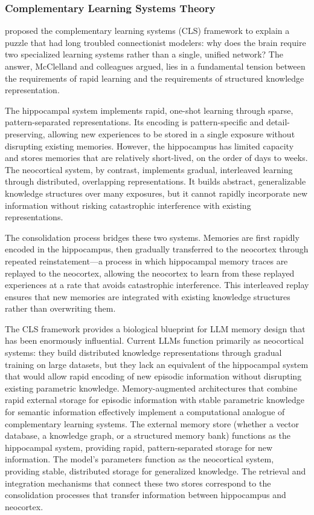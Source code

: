 \documentclass[11pt,letterpaper]{article}
\begin{document}
\subsubsection{Complementary Learning Systems Theory}

\cite{mcclelland1995complementary} proposed the complementary learning systems (CLS) framework to explain a puzzle that had long troubled connectionist modelers: why does the brain require two specialized learning systems rather than a single, unified network? The answer, McClelland and colleagues argued, lies in a fundamental tension between the requirements of rapid learning and the requirements of structured knowledge representation.

The hippocampal system implements rapid, one-shot learning through sparse, pattern-separated representations. Its encoding is pattern-specific and detail-preserving, allowing new experiences to be stored in a single exposure without disrupting existing memories. However, the hippocampus has limited capacity and stores memories that are relatively short-lived, on the order of days to weeks. The neocortical system, by contrast, implements gradual, interleaved learning through distributed, overlapping representations. It builds abstract, generalizable knowledge structures over many exposures, but it cannot rapidly incorporate new information without risking catastrophic interference with existing representations.

The consolidation process bridges these two systems. Memories are first rapidly encoded in the hippocampus, then gradually transferred to the neocortex through repeated reinstatement---a process in which hippocampal memory traces are replayed to the neocortex, allowing the neocortex to learn from these replayed experiences at a rate that avoids catastrophic interference. This interleaved replay ensures that new memories are integrated with existing knowledge structures rather than overwriting them.

The CLS framework provides a biological blueprint for LLM memory design that has been enormously influential. Current LLMs function primarily as neocortical systems: they build distributed knowledge representations through gradual training on large datasets, but they lack an equivalent of the hippocampal system that would allow rapid encoding of new episodic information without disrupting existing parametric knowledge. Memory-augmented architectures that combine rapid external storage for episodic information with stable parametric knowledge for semantic information effectively implement a computational analogue of complementary learning systems. The external memory store (whether a vector database, a knowledge graph, or a structured memory bank) functions as the hippocampal system, providing rapid, pattern-separated storage for new information. The model's parameters function as the neocortical system, providing stable, distributed storage for generalized knowledge. The retrieval and integration mechanisms that connect these two stores correspond to the consolidation processes that transfer information between hippocampus and neocortex.
\end{document}
